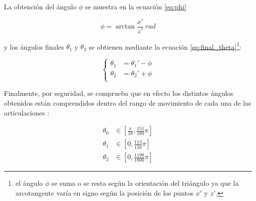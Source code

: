 La obtención del ángulo $\phi$ se muestra en la ecuación \ref{eq:phi}

\begin{equation}\label{eq:phi}
    \phi = \arctan{\frac{x'}{z'}}~rad
\end{equation}

y los ángulos finales $\theta_1$ y $\theta_2$ se obtienen mediante la ecuación
\ref{eq:final_theta}\footnote{el ángulo $\phi$ se suma o se resta según la orientación
    del triángulo ya que la arcotangente varía en signo según la posición de los puntos
    $x'$ y $z'$.}:

\begin{equation}\label{eq:final_theta}
    \left\{
    \begin{aligned}
        \theta_1 & = \theta_1' - \phi \\
        \theta_2 & = \theta_2' + \phi \\
    \end{aligned}
    \right.
\end{equation}

Finalmente, por seguridad, se comprueba que en efecto los distintos ángulos obtenidos
están comprendidos dentro del rango de movimiento de cada una de las articulaciones
\cite{UArmDeveloperSwiftProForArduino}:

\begin{align*}
    \theta_0 & \in \left[\frac{\pi}{18}, \frac{151}{180}\pi\right] \\
    \theta_1 & \in \left[0, \frac{113}{150}\pi\right]              \\
    \theta_2 & \in \left[0, \frac{1199}{1800}\pi\right]
\end{align*}